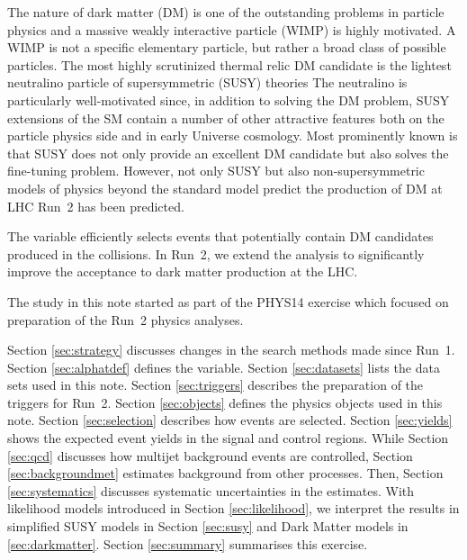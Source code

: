 The nature of dark matter (DM) is one of the outstanding problems in
particle physics and a massive weakly interactive particle (WIMP) is highly motivated. 
A WIMP is not a specific elementary particle, but rather a broad class of possible particles.
The most highly scrutinized thermal relic DM candidate is the lightest neutralino particle of supersymmetric (SUSY) theories  The
neutralino is particularly well-motivated since, in addition to solving the DM problem, SUSY extensions of the SM contain a number 
of other attractive features both on the particle physics side and in early Universe cosmology. Most prominently known is that 
SUSY does not only provide an excellent DM candidate but also solves the fine-tuning problem.
However, not only SUSY but also non-supersymmetric models of physics beyond the standard model predict the production of DM at 
LHC Run~2 has been predicted. 

The \alphat variable
efficiently selects events that potentially contain DM candidates
produced in the collisions. In Run~2, we extend the \alphat analysis
to significantly improve the acceptance to dark matter production at
the LHC.

The study in this note started as part of the PHYS14 exercise
\cite{PHYS14} which focused on preparation of the Run~2 physics analyses. 

Section \ref{sec:strategy} discusses changes in the search methods
made since Run~1. Section \ref{sec:alphatdef} defines the \alphat
variable.  Section \ref{sec:datasets} lists the data sets used in this
note.  Section \ref{sec:triggers} describes the preparation of the
triggers for Run~2. Section \ref{sec:objects} defines the physics
objects used in this note. Section \ref{sec:selection} describes how
events are selected. Section \ref{sec:yields} shows the expected event
yields in the signal and control regions. While Section \ref{sec:qcd}
discusses how multijet background events are controlled, Section
\ref{sec:backgroundmet} estimates background from other
processes. Then, Section \ref{sec:systematics} discusses systematic
uncertainties in the estimates. With likelihood models introduced in
Section \ref{sec:likelihood}, we interpret the results in simplified
SUSY models in Section \ref{sec:susy} and Dark Matter models in
\ref{sec:darkmatter}. Section \ref{sec:summary} summarises this
exercise.

